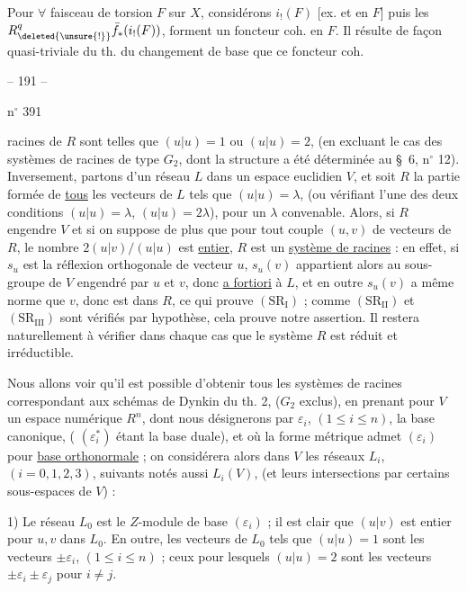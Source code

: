 Pour $\forall$ faisceau de torsion $F$ sur $X$,
considérons $i_!(F)$ [ex. et en $F$]
puis les $R^q_{\deleted{\unsure{!}}}\bar f_*(i_!(F))$, forment
un foncteur coh. en $F$. Il résulte
de façon quasi-triviale du th. du changement
de base que ce foncteur coh.



\begin{center}-- 191 --\end{center}
\hfill n$^{\circ}$ 391

racines de $R$ sont telles que $(u|u)=1$ ou $(u|u)=2$, (en excluant le cas des
systèmes de racines de type $G_2$, dont la structure a été déterminée au \S\ 6, n$^{\circ}$ 12).
Inversement, partons d'un réseau $L$ dans un espace euclidien $V$, et soit $R$ la
partie formée de \uline{tous} les vecteurs de $L$ tels que $(u|u)=\lambda$, (ou vérifiant l'une
des deux conditions $(u|u)=\lambda$, $(u|u)=2\lambda$), pour un $\lambda$ convenable. Alors,
si $R$ engendre $V$ et si on suppose de plus que pour tout couple $(u,v)$ de vecteurs
de $R$, le nombre $2(u|v)/(u|u)$ est \uline{entier}, $R$ est un \uline{système de racines} : en effet,
si $s_u$ est la réflexion orthogonale de vecteur $u$, $s_u(v)$ appartient alors au sous-groupe
de $V$ engendré par $u$ et $v$, donc \uline{a fortiori} à $L$, et en outre $s_u(v)$ a même
norme que $v$, donc est dans $R$, ce qui prouve $(\mathrm{SR}_{\mathrm I})$ ; comme
$(\mathrm{SR}_{\mathrm{II}})$ et $(\mathrm{SR}_{\mathrm{III}})$ sont
vérifiés par hypothèse, cela prouve notre assertion. Il restera naturellement
à vérifier dans chaque cas que le système $R$ est réduit et irréductible.

Nous allons voir qu'il est possible d'obtenir tous les systèmes de racines
correspondant aux schémas de Dynkin du th. 2, ($G_2$ exclus), en prenant pour $V$ un
espace numérique $R^n$, dont nous désignerons par $\varepsilon_i$, $(1\leq i\leq n)$, la base canonique,
( $(\varepsilon_i^*)$ étant la base duale), et où la forme métrique admet $(\varepsilon_i)$ pour
\uline{base orthonormale} ; on considérera alors dans $V$ les réseaux $L_i$, $(i=0,1,2,3)$,
suivants notés aussi $L_i(V)$, (et leurs intersections par certains sous-espaces
de $V$) :

1) Le réseau $L_0$ est le $Z$-module de base $(\varepsilon_i)$ ; il est clair que $(u|v)$ est
entier pour $u,v$ dans $L_0$. En outre, les vecteurs de $L_0$ tels que $(u|u)=1$ sont
les vecteurs $\pm\varepsilon_i$, $(1\leq i\leq n)$ ; ceux pour lesquels $(u|u)=2$ sont les vecteurs
$\pm\varepsilon_i\pm\varepsilon_j$ pour $i\ne j$.

